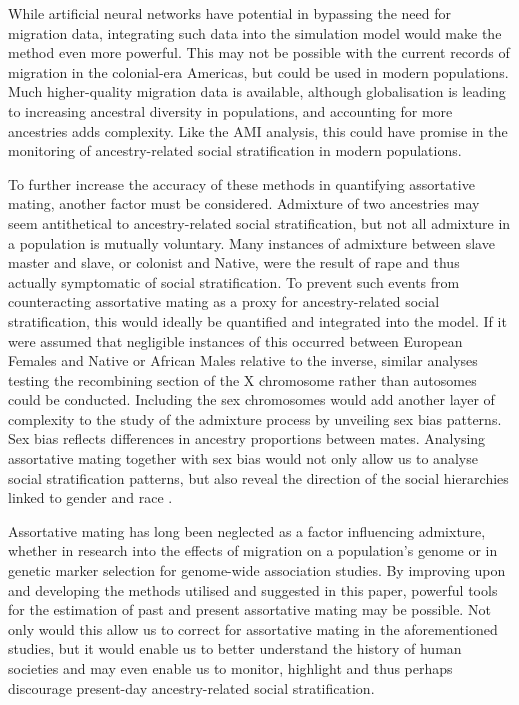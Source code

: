 \documentclass[11pt]{article}
\begin{document}
While artificial neural networks have potential in bypassing the need for migration data, integrating such data into the simulation model would make the method even more powerful. This may not be possible with the current records of migration in the colonial-era Americas, but could be used in modern populations. Much higher-quality migration data is available, although globalisation is leading to increasing ancestral diversity in populations, and accounting for more ancestries adds complexity. Like the AMI analysis, this could have promise in the monitoring of ancestry-related social stratification in modern populations.

To further increase the accuracy of these methods in quantifying assortative mating, another factor must be considered. Admixture of two ancestries may seem antithetical to ancestry-related social stratification, but not all admixture in a population is mutually voluntary. Many instances of admixture between slave master and slave, or colonist and Native, were the result of rape and thus actually symptomatic of social stratification. To prevent such events from counteracting assortative mating as a proxy for ancestry-related social stratification, this would ideally be quantified and integrated into the model. If it were assumed that negligible instances of this occurred between European Females and Native or African Males relative to the inverse, similar analyses testing the recombining section of the X chromosome rather than autosomes could be conducted. Including the sex chromosomes would add another layer of complexity to the study of the admixture process by unveiling sex bias patterns. Sex bias reflects differences in ancestry proportions between mates. Analysing assortative mating together with sex bias would not only allow us to analyse social stratification patterns, but also reveal the direction of the social hierarchies linked to gender and race \parencite{Micheletti2020}.

Assortative mating has long been neglected as a factor influencing admixture, whether in research into the effects of migration on a population's genome or in genetic marker selection for genome-wide association studies. By improving upon and developing the methods utilised and suggested in this paper, powerful tools for the estimation of past and present assortative mating may be possible. Not only would this allow us to correct for assortative mating in the aforementioned studies, but it would enable us to better understand the history of human societies and may even enable us to monitor, highlight and thus perhaps discourage present-day ancestry-related social stratification.
\end{document}
